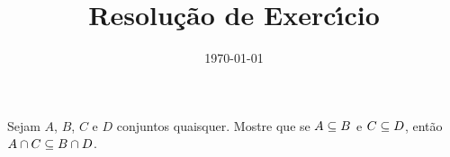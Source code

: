 \documentclass{beamer}
\title{Resolu\c{c}\~ao de Exerc{\'\i}cio}
\author[\autor]{\autor}
\institute[\instituto]{\instituto}
\date{\today}
\begin{document}
    \begin{frame}
        \maketitle
    \end{frame}


    \begin{frame}
        \begin{exercicio}
            Sejam $A$, $B$, $C$ e $D$ conjuntos quaisquer. Mostre que se $A \subseteq B$ e $C \subseteq D$, ent\~ao $A \cap C \subseteq B \cap D$.
        \end{exercicio}
    \end{frame}

    \begin{frame}
        \begin{solucao}
            \vspace{7cm}
        \end{solucao}
    \end{frame}
    \begin{frame}
        \begin{solucao}
            \vspace{7cm}
        \end{solucao}
    \end{frame}
    \begin{frame}
        \begin{solucao}
            \vspace{7cm}
        \end{solucao}
    \end{frame}
\end{document}
